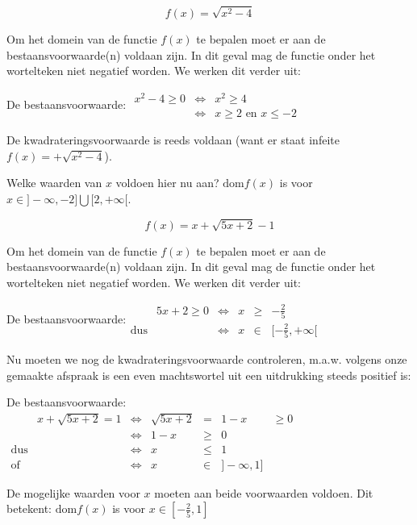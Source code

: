 \begin{voorbeeld}
	\begin{equation*}
f(x)=\sqrt{x^{2}-4}
\end{equation*}


Om het domein van de functie $f(x)$ te bepalen moet er aan de bestaansvoorwaarde(n)
voldaan zijn. In dit geval mag de functie onder het wortelteken niet
negatief worden. We werken dit verder uit:

De bestaansvoorwaarde: $\begin{array}{cccl}
x^{2}-4\geq0 &\iff & x^{2}\geq4\\
& \iff & x\geq2 \textrm{ en } x\leq-2
\end{array}$

De kwadrateringsvoorwaarde is reeds voldaan (want er staat infeite
$f(x)=+\sqrt{x^{2}-4}$).

Welke waarden van $x$ voldoen hier nu aan? $\textrm{dom}f(x)$ is voor $x\in]-\infty,-2]\bigcup[2,+\infty[$.

\end{voorbeeld}

\begin{voorbeeld}
\begin{equation*}
f(x)=x+\sqrt{5x+2}-1
\end{equation*}


Om het domein van de functie $f(x)$ te bepalen moet er aan de bestaansvoorwaarde(n)
voldaan zijn. In dit geval mag de functie onder het wortelteken niet
negatief worden. We werken dit verder uit:

De bestaansvoorwaarde:$\begin{array}{cclccc}
 & 5x+2\geq0
 & \iff & x & \geq & -\frac{2}{5}\\
\textrm{dus} & & \iff & x & \in & [-\frac{2}{5},+\infty[
\end{array}$

Nu moeten we nog de kwadrateringsvoorwaarde controleren, m.a.w. volgens
onze gemaakte afspraak is een even machtswortel uit een uitdrukking
steeds positief is:

De bestaansvoorwaarde:
$\begin{array}{cccclcc}
 & x+\sqrt{5x+2}=1 & \iff & \sqrt{5x+2} & = & 1-x & \geq0\\
 & & \iff & 1-x & \geq & 0\\
\textrm{dus} & & \iff & x & \leq & 1\\
\textrm{of} & & \iff & x & \in & ]-\infty,1]
\end{array}$

De mogelijke waarden voor $x$ moeten aan beide voorwaarden voldoen.
Dit betekent: $\textrm{dom}f(x)$ is voor $x\in[-\frac{2}{5},1]$

\end{voorbeeld}

